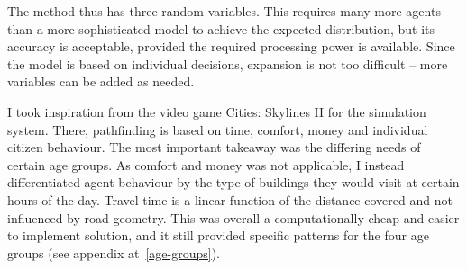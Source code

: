 The method thus has three random variables. This requires many more agents than a more sophisticated model to achieve the expected distribution, but its accuracy is acceptable, provided the required processing power is available. Since the model is based on individual decisions, expansion is not too difficult -- more variables can be added as needed. 

I took inspiration from the video game Cities: Skylines II for the simulation system. There, pathfinding is based on time, comfort, money and individual citizen behaviour.\cite{CSII-traffic} The most important takeaway was the differing needs of certain age groups. As comfort and money was not applicable, I instead differentiated agent behaviour by the type of buildings they would visit at certain hours of the day. Travel time is a linear function of the distance covered and not influenced by road geometry. This was overall a computationally cheap and easier to implement solution, and it still provided specific patterns for the four age groups (see appendix at~\ref{age-groups}).
